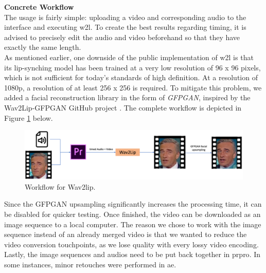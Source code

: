 \documentclass[
  a4paper,  %
  twoside,  %
  bibliography=totoc,
  headsepline,
  cleardoublepage=empty,
  parskip=half,
  draft=false
]{scrbook}
\begin{document}
\textbf{Concrete Workflow} \\
The usage is fairly simple: uploading a video and corresponding audio to the interface and executing \gls{w2l}. To create the best results regarding timing, it is advised to precisely edit the audio and video beforehand so that they have exactly the same length. \\
As mentioned earlier, one downside of the public implementation of \gls{w2l} is that its lip-synching model has been trained at a very low resolution of 96 x 96 pixels, which is not sufficient for today's standards of high definition. At a resolution of 1080p, a resolution of at least 256 x 256 is required. To mitigate this problem, we added a facial reconstruction library in the form of \textit{GFPGAN}, inspired by the Wav2Lip-GFPGAN GitHub project \cite{sainyAjaysainyWav2LipGFPGAN2023}.
The complete workflow is depicted in Figure \ref{fig:w2l workflow} below.

\begin{figure}[h]
  \centering
  \includegraphics[width=1\textwidth]{./graphics/wav2lip/w2l workflow.png}
  \caption{Workflow for Wav2lip.}
  \label{fig:w2l workflow}
\end{figure}

Since the GFPGAN upsampling significantly increases the processing time, it can be disabled for quicker testing. Once finished, the video can be downloaded as an image sequence to a local computer. The reason we chose to work with the image sequence instead of an already merged video is that we wanted to reduce the video conversion touchpoints, as we lose quality with every lossy video encoding. Lastly, the image sequences and audios need to be put back together in \gls{prpro}. In some instances, minor retouches were performed in \gls{ae}.
\end{document}

